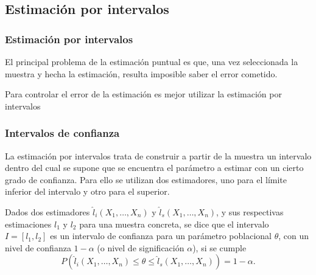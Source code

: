 \subsection{Estimación por intervalos}
\begin{frame}
\frametitle{Estimación por intervalos}
El principal problema de la estimación puntual es que, una vez seleccionada la muestra y hecha la estimación, resulta imposible saber el error cometido.
\begin{center}
\end{center}

Para controlar el error de la estimación es mejor utilizar la estimación por intervalos
\begin{center}
\end{center}
\end{frame}


\begin{frame}
\frametitle{Intervalos de confianza}
La estimación por intervalos trata de construir a partir de la muestra un intervalo dentro del cual se supone que se encuentra el parámetro a estimar con un cierto grado de confianza.
Para ello se utilizan dos estimadores, uno para el límite inferior del intervalo y otro para el superior.

\begin{definicion}
Dados dos estimadores $\hat l_i(X_1,\ldots,X_n)$ y $\hat l_s(X_1,\ldots,X_n)$, y sus respectivas estimaciones $l_1$ y $l_2$ para una muestra concreta, se dice que el intervalo $I=[l_1,l_2]$ es un intervalo de confianza para un parámetro poblacional $\theta$, con un nivel de confianza $1-\alpha$ (o nivel de significación $\alpha$), si se cumple
\[
P(\hat l_i(X_1,\ldots,X_n)\leq \theta \leq \hat l_s(X_1,\ldots,X_n))= 1-\alpha.
\]
\end{definicion}
\end{frame}



